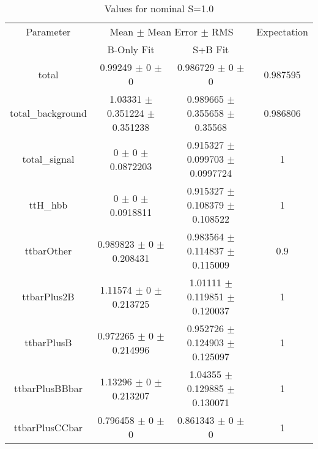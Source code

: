 \begin{table}
\centering
\caption{Values for nominal S=1.0}
\begin{tabular}{cccc}
\toprule
Parameter & \multicolumn{2}{c}{Mean $\pm$ Mean Error $\pm$ RMS} & Expectation\\
 & B-Only Fit & S+B Fit & \\
\midrule
total & \num{0.99249} $\pm$ \num{0} $\pm$ \num{0} & \num{0.986729} $\pm$ \num{0} $\pm$ \num{0} & \num{0.987595}\\
total\_background & \num{1.03331} $\pm$ \num{0.351224} $\pm$ \num{0.351238} & \num{0.989665} $\pm$ \num{0.355658} $\pm$ \num{0.35568} & \num{0.986806}\\
total\_signal & \num{0} $\pm$ \num{0} $\pm$ \num{0.0872203} & \num{0.915327} $\pm$ \num{0.099703} $\pm$ \num{0.0997724} & \num{1}\\
ttH\_hbb & \num{0} $\pm$ \num{0} $\pm$ \num{0.0918811} & \num{0.915327} $\pm$ \num{0.108379} $\pm$ \num{0.108522} & \num{1}\\
ttbarOther & \num{0.989823} $\pm$ \num{0} $\pm$ \num{0.208431} & \num{0.983564} $\pm$ \num{0.114837} $\pm$ \num{0.115009} & \num{0.9}\\
ttbarPlus2B & \num{1.11574} $\pm$ \num{0} $\pm$ \num{0.213725} & \num{1.01111} $\pm$ \num{0.119851} $\pm$ \num{0.120037} & \num{1}\\
ttbarPlusB & \num{0.972265} $\pm$ \num{0} $\pm$ \num{0.214996} & \num{0.952726} $\pm$ \num{0.124903} $\pm$ \num{0.125097} & \num{1}\\
ttbarPlusBBbar & \num{1.13296} $\pm$ \num{0} $\pm$ \num{0.213207} & \num{1.04355} $\pm$ \num{0.129885} $\pm$ \num{0.130071} & \num{1}\\
ttbarPlusCCbar & \num{0.796458} $\pm$ \num{0} $\pm$ \num{0} & \num{0.861343} $\pm$ \num{0} $\pm$ \num{0} & \num{1}\\
\bottomrule
\end{tabular}
\end{table}